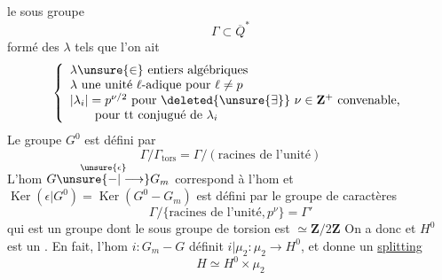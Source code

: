 le sous groupe
\[
\Gamma\subset\overline Q^*
\]
formé des $\lambda$ tels que l'on ait
\[
\left\{\begin{array}{l}
\lambda\unsure{\in}\ \text{entiers algébriques}\\
\lambda\ \text{une unité }\ell\text{-adique pour }\ell\ne p\\
|\lambda_i|=p^{\nu/2}\ \text{pour }\deleted{\unsure{\exists}}\ \nu\in\mathbf Z^+\ \text{convenable,}\\
\qquad\text{pour tt conjugué de }\lambda_i
\end{array}\right.
\]
Le groupe $G^0$ est défini par
\[
\Gamma/\Gamma_{\mathrm{tors}}=\Gamma/(\text{racines de l'unité})
\]
L'hom $G\overset{\unsure{\epsilon}}{\unsure{\mathbin{-}|\longrightarrow}}G_m$ correspond à l'hom
et $\operatorname{Ker}(\epsilon|G^0)=\operatorname{Ker}(G^0-G_m)$ est défini par le groupe de caractères
\[
\Gamma/\{\text{racines de l'unité},p^\nu\}=\Gamma'
\]
qui est un groupe  dont le sous groupe de torsion est $\simeq\mathbf Z/2\mathbf Z$
On a donc
et $H^0$ est un \uline{}. En fait, l'hom $i:G_m-G$ définit $i|\mu_2:\mu_2\longrightarrow H^0$, et donne un \uline{splitting}
\[
H\simeq H^0\times\mu_2
\]
